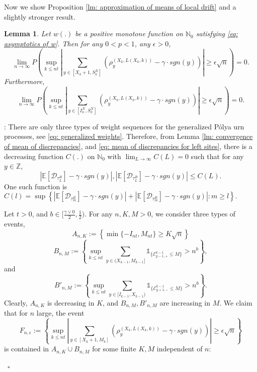 \documentclass[twoside,12pt,a4paper]{article}
\newtheorem{lemma}{Lemma}[section]
\numberwithin{equation}{section}
\newenvironment{proof}[1][Proof]{{\sc #1}:}{~\hfill $\square$}
\newcommand{\abs}[1]{\left\vert #1 \right\vert}
\begin{document}
		Now we show Proposition \ref{lm: approximation of means of local drift} and a slightly stronger result. 
		\begin{lemma}
			Let $w(.)$ be a positive monotone function on $\mathbb{N}_0$ satisfying \eqref{eq: asymptotics of w}. Then for any $0<p<1$, any $\epsilon>0$,
			$$
			\lim_{n\to\infty} P\left( \sup_{k\leq n t}  \abs{  	\sum_{y\in \left[X_{k}+1 ,S_{k}^X\right]} \left( \rho^{(X_k,L(X_k,k))}_y -  \gamma \cdot sgn(y) \right) } \geq  \epsilon \sqrt{n}     \right) =0.
			$$
			Furthermore,
		\[
	\lim_{n\to\infty} P\left( \sup_{k\leq n t}  \abs{  	\sum_{y\in \left[I_k^{X} ,S_{k}^X\right]} \left( \rho^{(X_k,L(X_k,k))}_y -  \gamma \cdot sgn(y) \right) } \geq  \epsilon \sqrt{n}     \right) =0.
	\]
\end{lemma}
\begin{proof} There are only three types of weight sequences for the generalized P\'{o}lya urn processes, see \eqref{eq: generalized weights}. Therefore, from Lemma \ref{lm: convergence of mean of discrepancies}, and \eqref{eq: mean of discrepancies for left sites}, there is a decreasing function $C(.)$ on $\mathbb{N}_0$ with $\lim_{L\to \infty}C(L) =0$ such that for any $y \in \mathbb{Z}$,
	\begin{equation}\label{eq: uniform convergence}
		\abs{\mathbb{E}\left[ \mathcal{D}_{\tau_L^R} \right] - \gamma \cdot sgn(y)}, \abs{\mathbb{E}\left[ \mathcal{D}_{\tau_L^B} \right] - \gamma \cdot sgn(y)} \leq C(L).
	\end{equation} One such function is $C(l) = \sup \left\{  \abs{\mathbb{E}\left[ \mathcal{D}_{\tau_m^R} \right] - \gamma \cdot sgn(y)} + \abs{\mathbb{E}\left[ \mathcal{D}_{\tau_m^B} \right] - \gamma \cdot sgn(y)} : m\geq l \right\}.     $  
	
	
	Let $t>0$, and $b \in [\frac{\gamma \vee 0 }{2},\frac{1}{2})$.  For any $n,K,M>0$, we consider three types of events, 
	$$A_{n,K}:=\left\{ \min\{-I_{nt}, M_{nt}\} \geq K \sqrt{n}  \right\}$$
	$$B_{n,M}:= \left\{  \sup_{k\leq n t} \sum_{ y\in (X_{k-1}, M_{k-1}]}  \mathbb{1}_{\{ \mathcal{E}^{k-1}_{y-1,+} \leq M  \}} >n^b  \right\},  $$
	and 
	$$B'_{n,M}:=  \left\{  \sup_{k\leq n t} \sum_{ y\in [I_{k-1}, X_{k-1})}  \mathbb{1}_{\{ \mathcal{E}^{k-1}_{y+1,-} \leq M  \}} >n^b  \right\}.$$
Clearly, $A_{n,K}$ is decreasing in $K$, and $B_{n,M}, B'_{n,M}$ are increasing in $M$. We claim that for $n$ large, the event 
$$
F_{n,\epsilon}:= \left\{ \sup_{k\leq n t}  \abs{  	\sum_{y\in [X_{k}+1 ,M_k]} \left( \rho^{(X_k,L(X_k,k))}_y -  \gamma \cdot sgn(y) \right) } \geq  \epsilon \sqrt{n}    \right \}$$ is contained in $A_{n,K} \cup B_{n,M} $ for some finite $K, M$ independent of $n$:   


\end{proof}
\end{document}
